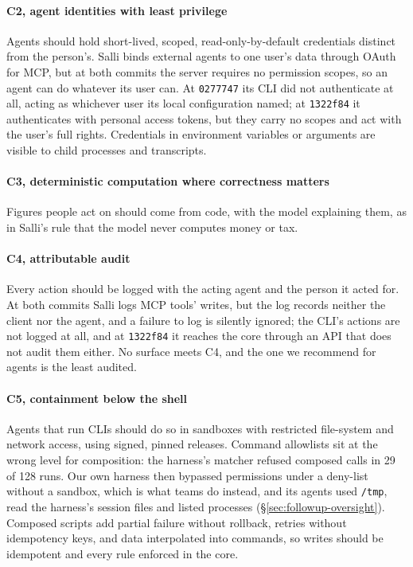\documentclass[sigconf,nonacm]{acmart}
\newcommand{\sysA}{Salli}
\begin{document}
\paragraph{C2, agent identities with least privilege}
Agents should hold short-lived, scoped, read-only-by-default credentials distinct from the person's. \sysA{} binds external agents to one user's data through OAuth for MCP, but at both commits the server requires no permission scopes, so an agent can do whatever its user can. At \texttt{0277747} its CLI did not authenticate at all, acting as whichever user its local configuration named; at \texttt{1322f84} it authenticates with personal access tokens, but they carry no scopes and act with the user's full rights. Credentials in environment variables or arguments are visible to child processes and transcripts.

\paragraph{C3, deterministic computation where correctness matters}
Figures people act on should come from code, with the model explaining them, as in \sysA{}'s rule that the model never computes money or tax.

\paragraph{C4, attributable audit}
Every action should be logged with the acting agent and the person it acted for. At both commits \sysA{} logs MCP tools' writes, but the log records neither the client nor the agent, and a failure to log is silently ignored; the CLI's actions are not logged at all, and at \texttt{1322f84} it reaches the core through an API that does not audit them either. No surface meets C4, and the one we recommend for agents is the least audited.

\paragraph{C5, containment below the shell}
Agents that run CLIs should do so in sandboxes with restricted file-system and network access, using signed, pinned releases. Command allowlists sit at the wrong level for composition: the harness's matcher refused composed calls in 29 of 128 runs. Our own harness then bypassed permissions under a deny-list without a sandbox, which is what teams do instead, and its agents used \texttt{/tmp}, read the harness's session files and listed processes (\S\ref{sec:followup-oversight}). Composed scripts add partial failure without rollback, retries without idempotency keys, and data interpolated into commands, so writes should be idempotent and every rule enforced in the core.
\end{document}
